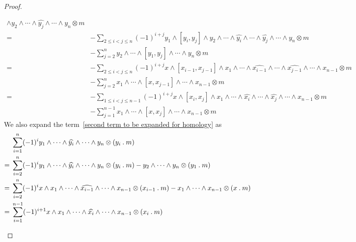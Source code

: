 \begin{proof}
\begin{enumerate}
\begin{align*}
        [y_1, y_j] \wedge y_2 \wedge \dotsb \wedge \widehat{y_j} \wedge \dotsb \wedge y_n
        \otimes m
        \\
        ={}&
        -
        \sum_{2 \leq i < j \leq n}
        (-1)^{i + j}
        y_1 \wedge [y_i, y_j] \wedge y_2 \wedge \dotsb \wedge \widehat{y_i} \wedge \dotsb \wedge \widehat{y_j} \wedge \dotsb \wedge y_n
        \otimes m
        \\
        {}&
        -
        \sum_{j=2}^n
        y_2 \wedge \dotsb \wedge [y_1, y_j] \wedge \dotsb \wedge y_n
        \otimes m
        \\
        ={}&
        -
        \sum_{2 \leq i < j \leq n}
        (-1)^{i + j}
        x \wedge [x_{i-1}, x_{j-1}] \wedge x_1 \wedge \dotsb \wedge \widehat{x_{i-1}} \wedge \dotsb \wedge \widehat{x_{j-1}} \wedge \dotsb \wedge x_{n-1}
        \otimes m
        \\
        {}&
        -
        \sum_{j=2}^n
        x_1 \wedge \dotsb \wedge [x, x_{j-1}] \wedge \dotsb \wedge x_{n-1}
        \otimes m
        \\
        ={}&
        -
        \sum_{1 \leq i < j \leq n-1}
        (-1)^{i + j}
        x \wedge [x_i, x_j] \wedge x_1 \wedge \dotsb \wedge \widehat{x_i} \wedge \dotsb \wedge \widehat{x_j} \wedge \dotsb \wedge x_{n-1}
        \otimes m
        \\
        {}&
        -
        \sum_{j=1}^{n-1}
        x_1 \wedge \dotsb \wedge [x, x_j] \wedge \dotsb \wedge x_{n-1}
        \otimes m
      \end{align*}
      We also expand the term~\eqref{second term to be expanded for homology} as
      \begin{align*}
        {}&
        \sum_{i=1}^n
        (-1)^i
        y_1 \wedge \dotsb \wedge \widehat{y_i} \wedge \dotsb \wedge y_n \otimes (y_i \act m)
        \\
        ={}&
        \sum_{i=2}^n
        (-1)^i
        y_1 \wedge \dotsb \wedge \widehat{y_i} \wedge \dotsb \wedge y_n \otimes (y_i \act m)
        -
        y_2 \wedge \dotsb \wedge y_n \otimes (y_1 \act m)
        \\
        ={}&
        \sum_{i=2}^n
        (-1)^i
        x \wedge x_1 \wedge \dotsb \wedge \widehat{x_{i-1}} \wedge \dotsb \wedge x_{n-1} \otimes (x_{i-1} \act m)
        -
        x_1 \wedge \dotsb \wedge x_{n-1} \otimes (x \act m)
        \\
        ={}&
        \sum_{i=1}^{n-1}
        (-1)^{i+1}
        x \wedge x_1 \wedge \dotsb \wedge \widehat{x_i} \wedge \dotsb \wedge x_{n-1} \otimes (x_i \act m)

\end{align*}
\end{enumerate}
\end{proof}
